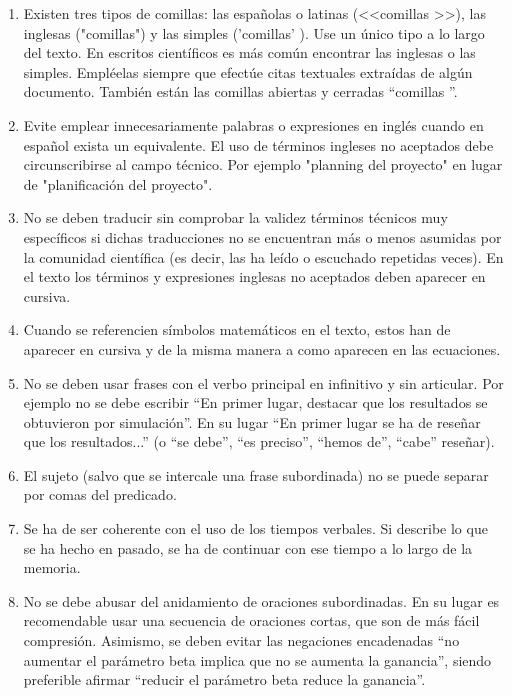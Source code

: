 \begin{enumerate}
\item Existen tres tipos de comillas: las españolas o latinas (<<comillas >>), las inglesas ("comillas") y las simples ('comillas' ). Use un único tipo a lo largo del texto. En escritos científicos es más común encontrar las inglesas o las simples. Empléelas siempre que efectúe citas textuales extraídas de algún documento.  También están las comillas abiertas y cerradas ``comillas ''. 


\item Evite   emplear   innecesariamente   palabras   o   expresiones   en   inglés cuando  en  español  exista  un  equivalente.  El  uso  de  términos  ingleses  no aceptados debe circunscribirse al campo técnico. Por ejemplo "planning del proyecto" en lugar de "planificación del proyecto". 

\item No se deben traducir sin comprobar la validez términos técnicos muy específicos si dichas traducciones no se encuentran más o menos asumidas por la comunidad científica (es decir, las   ha   leído   o   escuchado   repetidas   veces).   En   el   texto   los   términos   y expresiones inglesas no aceptados deben aparecer en cursiva.

\item Cuando  se  referencien  símbolos  matemáticos  en  el  texto,  estos  han  de aparecer   en   cursiva   y   de   la   misma   manera   a   como   aparecen   en   las ecuaciones.

\item No se deben usar frases con el verbo principal en infinitivo y sin articular. Por ejemplo no se debe escribir  “En  primer  lugar,  destacar  que  los  resultados  se  obtuvieron  por simulación”. En su lugar  “En primer  lugar se ha  de  reseñar que  los resultados...” (o “se debe”, “es preciso”, “hemos de”, “cabe” reseñar).

\item El sujeto (salvo que se intercale una frase subordinada) no se puede separar por comas del predicado. 

\item Se ha de ser   coherente  con  el  uso  de  los  tiempos  verbales.  Si  describe  lo  que  se  ha hecho en pasado, se ha de continuar  con ese tiempo a lo largo de la memoria. 

\item No se debe abusar del  anidamiento  de oraciones  subordinadas.  En  su  lugar  es recomendable  usar  una  secuencia  de  oraciones  cortas,  que  son  de  más  fácil compresión. Asimismo, se deben evitar las negaciones encadenadas 
“no  aumentar  el  parámetro  beta  implica  que  no  se  aumenta  la  ganancia”, siendo preferible afirmar “reducir el parámetro beta reduce la ganancia”.


\end{enumerate}
